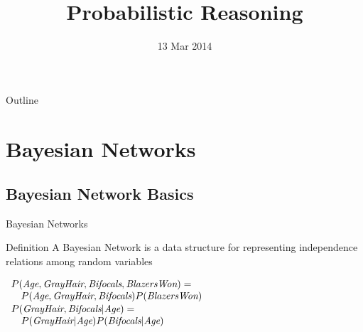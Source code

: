\documentclass[14pt]{beamer}
\title{Probabilistic Reasoning}
\date{13 Mar 2014}
\begin{document}
\begin{frame}
\titlepage
\end{frame}

\begin{frame}{Outline}
\tableofcontents
\end{frame}

\section{Bayesian Networks}

\subsection{Bayesian Network Basics}

\begin{frame}[label=bayes-net-definition]{Bayesian Networks}
\begin{block}{Definition}
A \alert{Bayesian Network} is a data structure for representing independence relations among random variables
\end{block}
\begin{center}
\end{center}
\pause
$
\begin{array}{ll}
\lefteqn{P(\textit{Age}, \textit{GrayHair}, \textit{Bifocals}, \textit{BlazersWon}) = \mbox{}}\\ 
& P(\textit{Age}, \textit{GrayHair}, \textit{Bifocals})P(\textit{BlazersWon})
\end{array}
$
\pause
\smallskip
$
\begin{array}{ll}
\lefteqn{P(\textit{GrayHair},\textit{Bifocals}|\textit{Age}) = \mbox{}}\\ 
& P(\textit{GrayHair}|\textit{Age})P(\textit{Bifocals}|\textit{Age})
\end{array}
$ \\
\end{frame}
\end{document}
